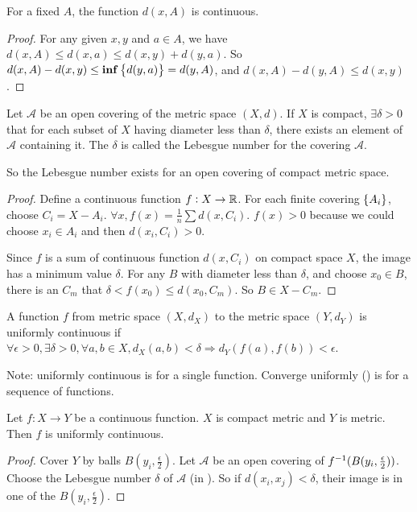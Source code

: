 \begin{theorem}
    For a fixed $A$, the function $d(x,A)$ is continuous.
\end{theorem}
\begin{proof}
    For any given $x,y$ and $a \in A$, we have $d(x,A) \leq d(x,a) \leq d(x,y) + d(y,a)$. So $d(x,A) - d(x,y) \leq \mathbf{inf} \set{d(y,a)} = d(y,A)$, and $d(x,A) - d(y,A) \leq d(x,y)$.
\end{proof}


\begin{theorem}\label{lebesgue_number}
    Let $\mathcal{A}$ be an open covering of the metric space $(X, d)$. If $X$ is compact, $\exists \delta > 0$ that for each subset of $X$ having diameter less than $\delta$, there exists an element of $\mathcal{A}$ containing it. The $\delta$ is called the Lebesgue number for the covering $\mathcal{A}$.
    
    So the Lebesgue number exists for an open covering of compact metric space.
\end{theorem}
\begin{proof}
    Define a continuous function $f : X \rightarrow \mathbb{R}$. For each finite covering $\set{A_i}$, choose $C_i = X - A_i$. $\displaystyle \forall x, f(x) = \frac{1}{n} \sum d(x,C_i)$. $f(x) > 0$ because we could choose $x_i \in A_i$ and then $d(x_i, C_i) > 0$.
    
     Since $f$ is a sum of continuous function $d(x,C_i)$ on compact space $X$, the image has a minimum value $\delta$. For any $B$ with diameter less than $\delta$, and choose $x_0 \in B$, there is an $C_m$ that $\delta < f(x_0) \leq d(x_0, C_m)$. So $B \in X - C_m$.
\end{proof}

\begin{definition}
    A function $f$ from metric space $(X, d_X)$ to the metric space $(Y, d_Y)$ is uniformly continuous if $\forall \epsilon > 0, \exists \delta > 0, \forall a,b \in X, d_X (a,b) < \delta \Rightarrow d_Y \left(f(a), f(b)\right) < \epsilon$.
    
    Note: uniformly continuous is for a single function. Converge uniformly () is for a sequence of functions.
\end{definition}

\begin{theorem}
    Let $f: X \rightarrow Y$ be a continuous function. $X$ is compact metric and $Y$ is metric. Then $f$ is uniformly continuous.    
\end{theorem}
\begin{proof}
    Cover $Y$ by balls $B(y_i, \frac{\epsilon}{2})$. Let $\mathcal{A}$ be an open covering of ${f}^{-1}(B(y_i, \frac{\epsilon}{2}))$. Choose the Lebesgue number $\delta$ of $\mathcal{A}$ (in ). So if $d(x_i, x_j) < \delta$, their image is in one of the $B(y_i, \frac{\epsilon}{2})$.
\end{proof}





